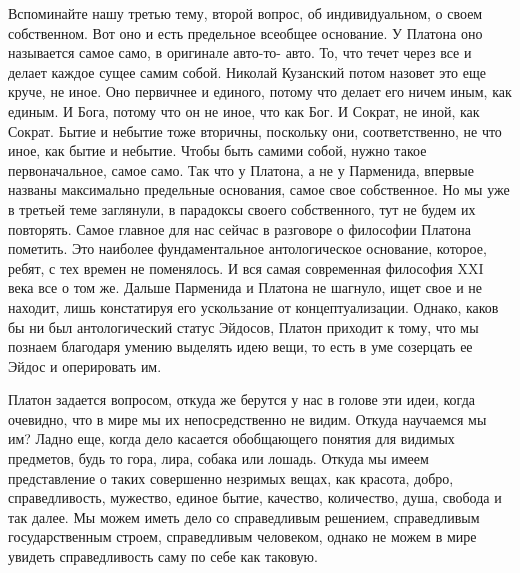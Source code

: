 Вспоминайте нашу третью тему, второй
вопрос, об индивидуальном, о своем собственном. Вот оно и есть предельное
всеобщее основание. У Платона оно называется самое само, в оригинале авто-то-
авто. То, что течет через все и делает каждое сущее самим собой. Николай
Кузанский потом назовет это еще круче, не иное. Оно первичнее и единого, потому
что делает его ничем иным, как единым. И Бога, потому что он не иное, что как
Бог. И Сократ, не иной, как Сократ. Бытие и небытие тоже вторичны, поскольку
они, соответственно, не что иное, как бытие и небытие. Чтобы быть самими собой,
нужно такое первоначальное, самое само. Так что у Платона, а не у Парменида,
впервые названы максимально предельные основания, самое свое собственное. Но мы
уже в третьей теме заглянули, в парадоксы своего собственного, тут не будем их
повторять. Самое главное для нас сейчас в разговоре о философии Платона
пометить. Это наиболее фундаментальное антологическое основание, которое, ребят,
с тех времен не поменялось. И вся самая современная философия XXI века все о том
же. Дальше Парменида и Платона не шагнуло, ищет свое и не находит, лишь
констатируя его ускользание от концептуализации. Однако, каков бы ни был
антологический статус Эйдосов, Платон приходит к тому, что мы познаем благодаря
умению выделять идею вещи, то есть в уме созерцать ее Эйдос и оперировать им.


Платон задается вопросом, откуда же берутся у нас в голове эти идеи, когда
очевидно, что в мире мы их непосредственно не видим. Откуда научаемся мы им?
Ладно еще, когда дело касается обобщающего понятия для видимых предметов, будь
то гора, лира, собака или лошадь. Откуда мы имеем представление о таких
совершенно незримых вещах, как красота, добро, справедливость, мужество, единое
бытие, качество, количество, душа, свобода и так далее. Мы можем иметь дело со
справедливым решением, справедливым государственным строем, справедливым
человеком, однако не можем в мире увидеть справедливость саму по себе как
таковую. 

